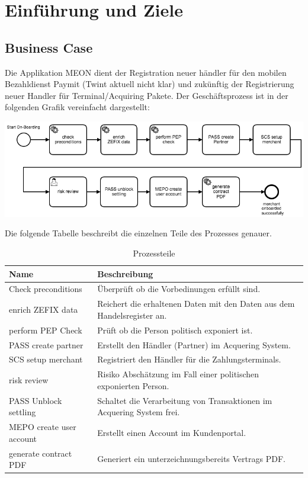 \graphicspath{{./images/}}


\chapter{Einführung und Ziele}

\section{Business Case}

Die Applikation MEON dient der Registration neuer händler für den mobilen Bezahldienst Paymit (Twint aktuell nicht klar) und zukünftig der Registrierung neuer Handler für Terminal/Acquiring Pakete.  Der Geschäftsprozess ist in der folgenden Grafik vereinfacht dargestellt:

\begin{center}
	\includegraphics[scale=0.55]{meon-workflow.png}
\end{center}

Die folgende Tabelle beschreibt die einzelnen Teile des Prozesses genauer.

\begin{table}[H]
	\centering
	\caption{Prozessteile}
	\begin{tabular}{ | p{4cm} | p{12cm} | }
		\toprule
		{\textbf{Name}} & {\textbf{Beschreibung}} \\
		\midrule
		Check preconditions & Überprüft ob die Vorbedinungen erfüllt sind. \\ \hline
		enrich ZEFIX data & Reichert die erhaltenen Daten mit den Daten aus dem Handelsregister an. \\ \hline
		perform PEP Check & Prüft ob die Person politisch exponiert ist. \\ \hline
		PASS create partner & Erstellt den Händler (Partner) im Acquering System.\\ \hline
		SCS setup merchant & Registriert den Händler für die Zahlungsterminals. \\ \hline
		risk review  & Risiko Abschätzung im Fall einer politischen exponierten Person. \\ \hline
	    PASS Unblock settling & Schaltet die Verarbeitung von Transaktionen im Acquering System frei. \\ \hline
	    MEPO create user account&  Erstellt einen Account im Kundenportal. \\ \hline
	    generate contract PDF & Generiert ein unterzeichnungsbereits Vertrags PDF.  \\
		\bottomrule
	\end{tabular}
\end{table}

